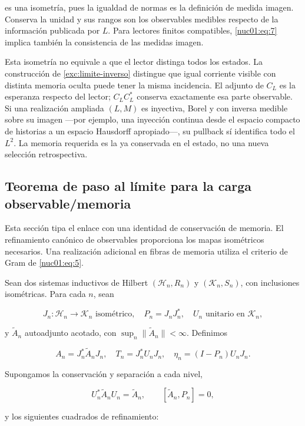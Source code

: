 es una isometría, pues la igualdad de normas es la definición de medida imagen. Conserva la unidad y sus rangos son los observables medibles respecto de la información publicada por \(L\). Para lectores finitos compatibles, \eqref{nuc01:eq:7} implica también la consistencia de las medidas imagen.

Esta isometría no equivale a que el lector distinga todos los estados. La construcción de \cref{exc:limite-inverso} distingue que igual corriente visible con distinta memoria oculta puede tener la misma incidencia. El adjunto de \(C_L\) es la esperanza respecto del lector; \(C_LC_L^*\) conserva exactamente esa parte observable. Si una realización ampliada \((L,M)\) es inyectiva, Borel y con inversa medible sobre su imagen —por ejemplo, una inyección continua desde el espacio compacto de historias a un espacio Hausdorff apropiado—, su pullback sí identifica todo el \(L^2\). La memoria requerida es la ya conservada en el estado, no una nueva selección retrospectiva.

\subsection{Teorema de paso al límite para la carga observable/memoria}

Esta sección tipa el enlace con una identidad de conservación de memoria. El refinamiento canónico de observables proporciona los mapas isométricos necesarios. Una realización adicional en fibras de memoria utiliza el criterio de Gram de \eqref{nuc01:eq:5}.

Sean dos sistemas inductivos de Hilbert \((\mathscr H_n,R_n)\) y \((\mathscr K_n,S_n)\), con inclusiones isométricas. Para cada \(n\), sean

\[
J_n:\mathscr H_n\to\mathscr K_n\text{ isométrico},\quad
P_n=J_nJ_n^*,\quad U_n\text{ unitario en }\mathscr K_n,
\]

y \(\widetilde A_n\) autoadjunto acotado, con \(\sup_n\|\widetilde A_n\|<\infty\). Definimos

\[
A_n=J_n^*\widetilde A_nJ_n,\quad
T_n=J_n^*U_nJ_n,\quad
\eta_n=(I-P_n)U_nJ_n.
\]

Supongamos la conservación y separación a cada nivel,

\begin{equation}
U_n^*\widetilde A_nU_n=\widetilde A_n,
\qquad [\widetilde A_n,P_n]=0,
\label{nuc01:eq:8}
\end{equation}

y los siguientes cuadrados de refinamiento:

